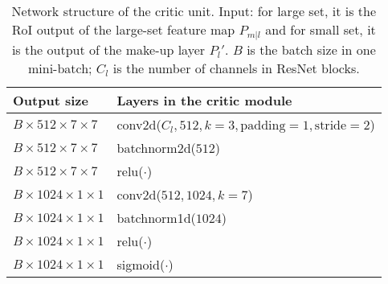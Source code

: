 \documentclass{article} \usepackage{iclr2019_conference,times}
\begin{document}
\begin{table*}[h]
	\centering
	\begin{tabular}{   l |  l}
		Output size & Layers in the critic module \\ \toprule
		$B \times 512 \times 7 \times 7$ & conv2d($C_l, 512, k=3, \text{padding}=1, \text{stride}=2$) \\
		$B \times 512 \times 7 \times 7$ & batchnorm2d($512$) \\
		$B \times 512 \times 7 \times 7$ & relu($\cdot$) \\
		$B \times 1024 \times 1 \times 1$ & conv2d($512, 1024, k=7$) \\
		$B \times 1024 \times 1 \times 1$ & batchnorm1d($1024$) \\
		$B \times 1024 \times 1 \times 1$ & relu($\cdot$) \\
		$B \times 1024 \times 1 \times 1$ & sigmoid($\cdot$) \\
	\end{tabular}
	\vspace{-.2cm}
	\caption{
{
		Network structure of the critic unit.
Input: for large set, it is the RoI output of the large-set feature map $P_{m|l}$ and for small set, it is the output of the make-up layer $P_l'$.
		$B$ is the batch size in one mini-batch; $C_l$ is the number of channels in ResNet blocks.}
}\label{tab:critic_layer}
\end{table*}
\end{document}
